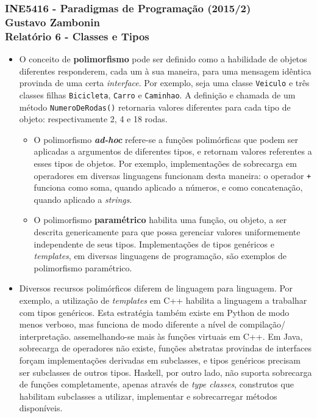 \documentclass{article}
\begin{document}
\subsubsection*{INE5416 - Paradigmas de Programação (2015/2) \\
    Gustavo Zambonin \\
    Relatório 6 - Classes e Tipos
}

\begin{itemize}
    \item O conceito de \textbf{polimorfismo} pode ser definido como a
    habilidade de objetos diferentes responderem, cada um à sua maneira, para
    uma mensagem idêntica provinda de uma certa \textit{interface}. Por exemplo,
    seja uma classe \texttt{Veiculo} e três classes filhas \texttt{Bicicleta},
    \texttt{Carro} e \texttt{Caminhao}. A definição e chamada de um método
    \texttt{NumeroDeRodas()} retornaria valores diferentes para cada tipo de
    objeto: respectivamente 2, 4 e 18 rodas.
    \begin{itemize}

        \item O polimorfismo \textbf{\textit{ad-hoc}} refere-se a funções
        polimórficas que podem ser aplicadas a argumentos de diferentes tipos, e
        retornam valores referentes a esses tipos de objetos. Por exemplo,
        implementações de sobrecarga em operadores em diversas linguagens
        funcionam desta maneira: o operador \texttt{+} funciona como soma,
        quando aplicado a números, e como concatenação, quando aplicado a
        \textit{strings}.

        \item O polimorfismo \textbf{paramétrico} habilita uma função, ou
        objeto, a ser descrita genericamente para que possa gerenciar valores
        uniformemente independente de seus tipos. Implementações de tipos
        genéricos e \textit{templates}, em diversas linguagens de programação,
        são exemplos de polimorfismo paramétrico.
    \end{itemize}

    \item Diversos recursos polimórficos diferem de linguagem para linguagem.
    Por exemplo, a utilização de \textit{templates} em C++ habilita a linguagem
    a trabalhar com tipos genéricos. Esta estratégia também existe em Python de
    modo menos verboso, mas funciona de modo diferente a nível de compilação/
    interpretação. assemelhando-se mais às funções virtuais em C++. Em Java,
    sobrecarga de operadores não existe, funções abstratas provindas de
    interfaces forçam implementações derivadas em subclasses, e tipos genéricos
    precisam ser subclasses de outros tipos. Haskell, por outro lado, não
    suporta sobrecarga de funções completamente, apenas através de
    \textit{type classes}, construtos que habilitam subclasses a utilizar,
    implementar e sobrecarregar métodos disponíveis.


\end{itemize}
\end{document}
